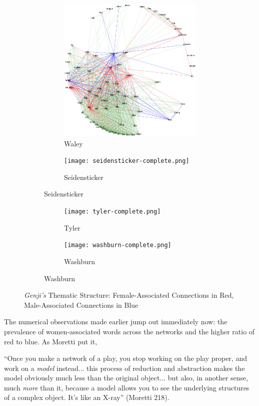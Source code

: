 \documentclass[12pt]{article}
\begin{document}
\begin{flushleft}
\begin{spacing}{2.0}
\begin{figure}
	\begin{subfigure}{\linewidth}
		\begin{subfigure}{.5\linewidth}
			\includegraphics[width=3in]{waley-complete.png}
			\caption{Waley}
	  	\end{subfigure}
	  	\begin{subfigure}{.5\linewidth}
			\texttt{[image: seidensticker-complete.png]}\hfill
			\caption{Seidensticker}
	  	\end{subfigure}
	\end{subfigure}\par\medskip
	\begin{subfigure}{\linewidth}
		\begin{subfigure}{.5\linewidth}
	  		\texttt{[image: tyler-complete.png]}
	  		\caption{Tyler}
		\end{subfigure}
		\begin{subfigure}{.5\linewidth}
	  		\texttt{[image: washburn-complete.png]}\hfill
	  		\caption{Washburn}
		\end{subfigure}
	\end{subfigure}
	\caption{\textit{Genji's} Thematic Structure: Female-Associated Connections in Red, Male-Associated Connections in Blue}
	\label{full-networks}
\end{figure}

The numerical observations made earlier jump out immediately now: the prevalence of women-associated words across the networks and the higher ratio of red to blue. As Moretti put it, 

\begin{displayquote}
\singlespacing
\small
``Once you make a network of a play, you stop working on the play proper, and work on a \textit{model} instead... this process of reduction and abstraction makes the model obviously much less than the original object... but also, in another sense, much \textit{more} than it,  because a model allows you to see the underlying structures of a complex object. It's like an X-ray'' (Moretti 218). 
\end{displayquote}


\end{spacing}
\end{flushleft}
\end{document}
